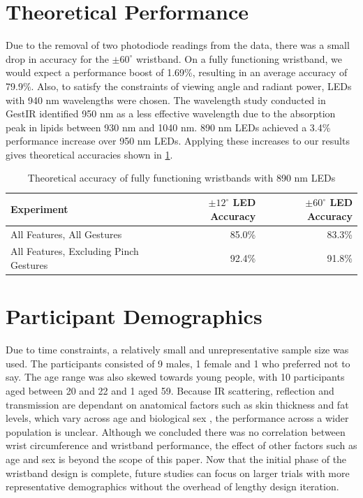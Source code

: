 \documentclass[ oneside,%
                    author={Jack Jarvis},
                    degree={BSc},
                     title={FlexIR: Flexible PCB Wristbands for Infrared Based Gesture Recognition},
                    unit={COMS30045},
                    subtitle={Investigating the Effect of LED Viewing Angle on Gesture Classification in Infrared Sensing Systems}]{dissertation}
\begin{document}
\section{Theoretical Performance}
Due to the removal of two photodiode readings from the data, there was a small drop in accuracy for the $\pm 60^\circ$ wristband. On a fully functioning wristband, we would expect a performance boost of 1.69\%, resulting in an average accuracy of 79.9\%. Also, to satisfy the constraints of viewing angle and radiant power, LEDs with 940 nm wavelengths were chosen. The wavelength study conducted in GestIR \cite{diamand2025} identified 950 nm as a less effective wavelength due to the absorption peak in lipids between 930 nm and 1040 nm. 890 nm LEDs achieved a 3.4\% performance increase over 950 nm LEDs. Applying these increases to our results gives theoretical accuracies shown in \cref{tab:theoretical_accs}.

\begin{table}[htp]
    \centering
    \begin{tabular}{lrr}
        \toprule
        Experiment & $\pm 12^\circ$ LED Accuracy & $\pm 60^\circ$ LED Accuracy \\
        \midrule
        All Features, All Gestures & 85.0\% & 83.3\% \\
        All Features, Excluding Pinch Gestures & 92.4\% & 91.8\% \\
        \bottomrule
    \end{tabular}
    \caption{Theoretical accuracy of fully functioning wristbands with 890 nm LEDs}
    \label{tab:theoretical_accs}
\end{table}

\section{Participant Demographics}
Due to time constraints, a relatively small and unrepresentative sample size was used. The participants consisted of 9 males, 1 female and 1 who preferred not to say. The age range was also skewed towards young people, with 10 participants aged between 20 and 22 and 1 aged 59. Because IR scattering, reflection and transmission are dependant on anatomical factors such as skin thickness and fat levels, which vary across age and biological sex \cite{diamand2025}, the performance across a wider population is unclear. Although we concluded there was no correlation between wrist circumference and wristband performance, the effect of other factors such as age and sex is beyond the scope of this paper. Now that the initial phase of the wristband design is complete, future studies can focus on larger trials with more representative demographics without the overhead of lengthy design iteration.
\end{document}
